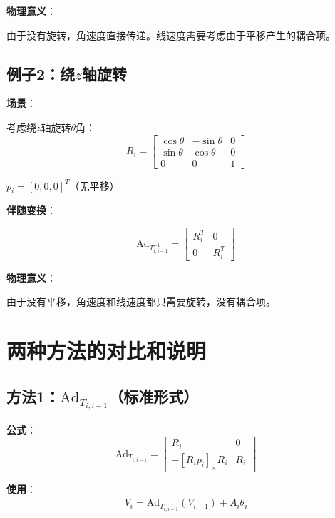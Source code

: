\documentclass[12pt,a4paper]{article}
\begin{document}
\textbf{物理意义}：

由于没有旋转，角速度直接传递。线速度需要考虑由于平移产生的耦合项。

\subsection{例子2：绕$z$轴旋转}

\textbf{场景}：

考虑绕$z$轴旋转$\theta$角：
\begin{equation}
R_i = \begin{bmatrix}
\cos\theta & -\sin\theta & 0 \\
\sin\theta & \cos\theta & 0 \\
0 & 0 & 1
\end{bmatrix}
\end{equation}

$p_i = [0, 0, 0]^T$（无平移）

\textbf{伴随变换}：

\begin{equation}
\text{Ad}_{T_{i,i-1}^{-1}} = \begin{bmatrix}
R_i^T & 0 \\
0 & R_i^T
\end{bmatrix}
\end{equation}

\textbf{物理意义}：

由于没有平移，角速度和线速度都只需要旋转，没有耦合项。

\section{两种方法的对比和说明}

\subsection{方法1：$\text{Ad}_{T_{i,i-1}}$（标准形式）}

\textbf{公式}：
\begin{equation}
\text{Ad}_{T_{i,i-1}} = \begin{bmatrix}
R_i & 0 \\
-[R_i p_i]_{\times} R_i & R_i
\end{bmatrix}
\end{equation}

\textbf{使用}：
\begin{equation}
V_i = \text{Ad}_{T_{i,i-1}}(V_{i-1}) + A_i \dot{\theta}_i
\end{equation}
\end{document}
